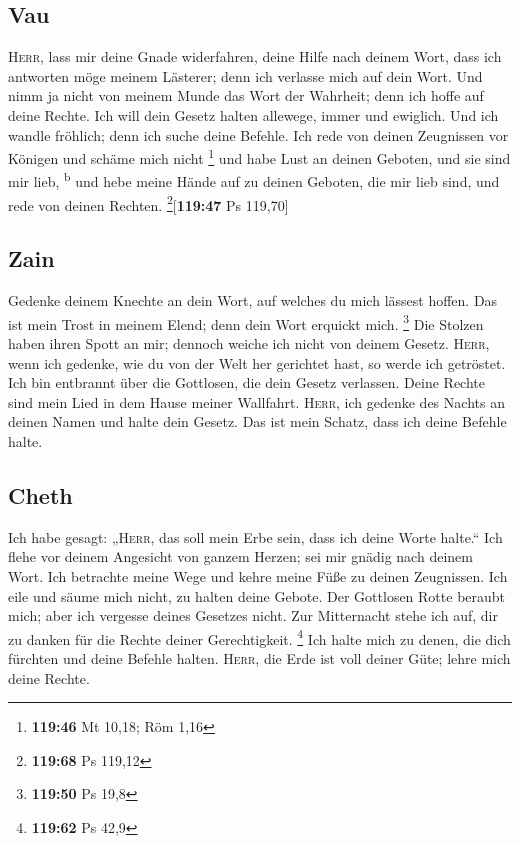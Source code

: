 \hypertarget{vau}{%
\subsection{Vau}\label{vau}}

 \textsc{Herr}, lass mir deine Gnade widerfahren, deine
Hilfe nach deinem Wort,  dass ich antworten möge meinem
Lästerer; denn ich verlasse mich auf dein Wort.  Und nimm
ja nicht von meinem Munde das Wort der Wahrheit; denn ich hoffe auf
deine Rechte.  Ich will dein Gesetz halten allewege,
immer und ewiglich.  Und ich wandle fröhlich; denn ich
suche deine Befehle.  Ich rede von deinen Zeugnissen vor
Königen und schäme mich nicht \footnote{\textbf{119:46} Mt 10,18; Röm
  1,16}  und habe Lust an deinen Geboten, und sie sind
mir lieb, \textsuperscript{b}  und hebe meine Hände auf
zu deinen Geboten, die mir lieb sind, und rede von deinen Rechten.
\footnote{\textbf{119:68} Ps 119,12}{[}\textbf{119:47} Ps 119,70{]}

\hypertarget{zain}{%
\subsection{Zain}\label{zain}}

 Gedenke deinem Knechte an dein Wort, auf welches du mich
lässest hoffen.  Das ist mein Trost in meinem Elend; denn
dein Wort erquickt mich. \footnote{\textbf{119:50} Ps 19,8}
 Die Stolzen haben ihren Spott an mir; dennoch weiche ich
nicht von deinem Gesetz.  \textsc{Herr}, wenn ich
gedenke, wie du von der Welt her gerichtet hast, so werde ich getröstet.
 Ich bin entbrannt über die Gottlosen, die dein Gesetz
verlassen.  Deine Rechte sind mein Lied in dem Hause
meiner Wallfahrt.  \textsc{Herr}, ich gedenke des Nachts
an deinen Namen und halte dein Gesetz.  Das ist mein
Schatz, dass ich deine Befehle halte.

\hypertarget{cheth}{%
\subsection{Cheth}\label{cheth}}

 Ich habe gesagt: „\textsc{Herr}, das soll mein Erbe
sein, dass ich deine Worte halte.``  Ich flehe vor deinem
Angesicht von ganzem Herzen; sei mir gnädig nach deinem Wort.
 Ich betrachte meine Wege und kehre meine Füße zu deinen
Zeugnissen.  Ich eile und säume mich nicht, zu halten
deine Gebote.  Der Gottlosen Rotte beraubt mich; aber ich
vergesse deines Gesetzes nicht.  Zur Mitternacht stehe
ich auf, dir zu danken für die Rechte deiner Gerechtigkeit. \footnote{\textbf{119:62}
  Ps 42,9}  Ich halte mich zu denen, die dich fürchten
und deine Befehle halten.  \textsc{Herr}, die Erde ist
voll deiner Güte; lehre mich deine Rechte.

